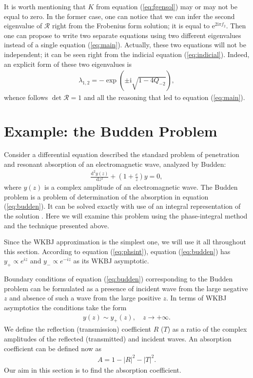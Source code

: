 \documentclass{ws-m3as}
\def\rmi{\mathrm{i}}
\def\rme{\mathrm{e}}
\def\rmd{\mathrm{d}}
\def\R{\bm{\mathcal{R}}}
\newcommand\eref[1]{(\ref{#1})}
\begin{document}
It is worth mentioning that $K$ from equation \eref{eq:fgensol} may or may not be equal to zero. In the
former case, one can notice that we can infer the second eigenvalue of $\R$ right from the
Frobenius form solution; it is equal to $\rme^{2 \rmi \pi f_2}$. Then one can propose to write two
separate equations using two different eigenvalues instead of a single equation \eref{eq:main}.
Actually, these two equations will not be independent; it can be seen right from the
indicial equation \eref{eq:indicial}. Indeed, an explicit form of these two eigenvalues is
\begin{eqnarray}
\lambda_{1,2} = - \exp(\pm \rmi \sqrt{1 - 4 Q_{-2}}),
\end{eqnarray}
whence follows $\det\R=1$ and all the reasoning that led to equation \eref{eq:main}.

\section{Example: the Budden Problem \label{sec:budden}}
Consider a differential equation described the standard problem of penetration and 
resonant absorption of an electromagnetic wave, analyzed by Budden:\cite{white-chen,budden}
\begin{eqnarray}
\frac{\rmd^2 y(z)}{\rmd z^2} + \left( 1 + \frac{c}{z} \right) y = 0,  
\label{eq:budden}
\end{eqnarray}
where $y(z)$ is a complex amplitude of an electromagnetic wave.
The Budden problem is a problem of determination of the absorption in equation \eref{eq:budden}. 
It can be solved exactly with use of an integral representation of the solution \cite{rwbook}.
Here we will examine this problem using the phase-integral method and the technique presented above. 

Since the WKBJ approximation is the simplest one,
we will use it all throughout this section. According to equation \eref{eq:phsint}, 
equation \eref{eq:budden} has $y_+ \propto e^{iz}$ and $y_- \propto e^{-iz}$ as its WKBJ asymptotic. 

Boundary conditions of equation \eref{eq:budden} corresponding to the Budden problem can be
formulated as a presence of incident wave from the large negative $z$ and absence of such 
a wave from the large positive $z$. In terms of WKBJ asymptotics the conditions take the form
\begin{eqnarray}
y(z) \sim y_+(z), \quad z \rightarrow +\infty.  
\label{eq:bbound}
\end{eqnarray}
We define the reflection (transmission) coefficient $R$ ($T$) as
a ratio of the complex amplitudes of the reflected (transmitted) and incident waves. 
An absorption coefficient can be defined now as 
\begin{eqnarray}
A = 1 - |R|^2 - |T|^2.  
\label{eq:absdef}
\end{eqnarray}
Our aim in this section is to find the absorption coefficient.
\end{document}

